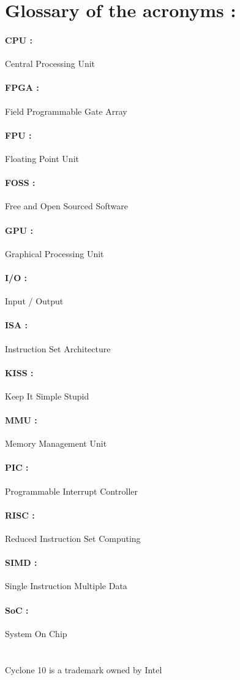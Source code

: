 \documentclass[12pt]{article}
\begin{document}
\section{Glossary of the acronyms :}

\paragraph{CPU : }Central Processing Unit
\paragraph{FPGA : }Field Programmable Gate Array
\paragraph{FPU : }Floating Point Unit
\paragraph{FOSS : }Free and Open Sourced Software
\paragraph{GPU : }Graphical Processing Unit
\paragraph{I/O : }Input / Output
\paragraph{ISA : }Instruction Set Architecture
\paragraph{KISS : }Keep It Simple Stupid
\paragraph{MMU : }Memory Management Unit
\paragraph{PIC : }Programmable Interrupt Controller
\paragraph{RISC : }Reduced Instruction Set Computing
\paragraph{SIMD : }Single Instruction Multiple Data 
\paragraph{SoC : }System On Chip

\section{}
Cyclone 10 is a trademark owned by Intel
\end{document}
